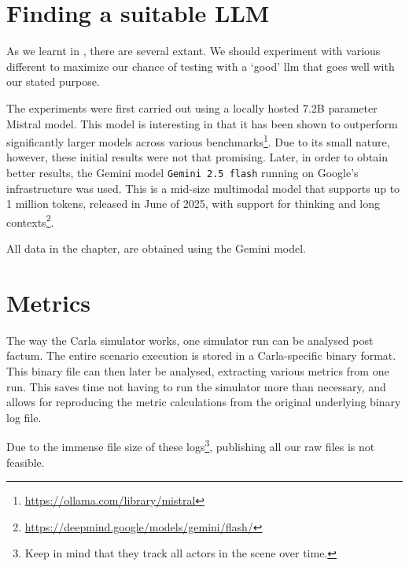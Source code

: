 \section{Finding a suitable LLM}

As we learnt in , there are several  extant. We should
experiment with various different  to maximize our chance of testing with a `good'
\acrshort{llm} that goes well with our stated purpose.

The experiments were first carried out using a locally hosted \num{7.2}B parameter Mistral model.
This model is interesting in that it has been shown to outperform significantly larger models
across various benchmarks\footnote{\url{https://ollama.com/library/mistral}}. Due to its small
nature, however, these initial results were not that promising. Later, in order to obtain better
results, the Gemini model \texttt{Gemini 2.5 flash} running on Google's infrastructure was used.
This is a mid-size multimodal model that supports up to 1 million tokens, released in June of 2025,
with support for thinking and long
contexts\footnote{\url{https://deepmind.google/models/gemini/flash/}}.

All data in the  chapter, are obtained using the Gemini model.

\section{Metrics}

The way the Carla simulator works, one simulator run can be analysed post factum. The entire
scenario execution is stored in a Carla-specific binary format. This binary file can then later be
analysed, extracting various metrics from one run. This saves time not having to run the simulator
more than necessary, and allows for reproducing the metric calculations from the original underlying
binary log file.

Due to the immense file size of these logs\footnote{Keep in mind that they track all actors in the
    scene over time.}, publishing all our raw files is not feasible.
